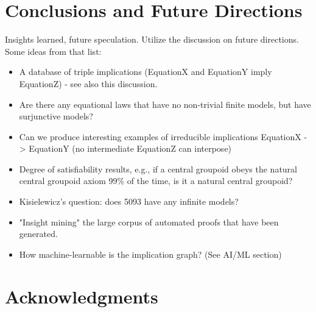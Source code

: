 \section{Conclusions and Future Directions}


Insights learned, future speculation. Utilize the discussion on future directions. Some ideas from that list:

\begin{itemize}
  \item A database of triple implications (EquationX and EquationY imply EquationZ) - see also this discussion.
  \item Are there any equational laws that have no non-trivial finite models, but have surjunctive models?
  \item Can we produce interesting examples of irreducible implications EquationX -> EquationY (no intermediate EquationZ can interpose)
  \item Degree of satisfiability results, e.g., if a central groupoid obeys the natural central groupoid axiom 99\% of the time, is it a natural central groupoid?
  \item Kisielewicz's question: does 5093 have any infinite models?
  \item "Insight mining" the large corpus of automated proofs that have been generated.
  \item How machine-learnable is the implication graph? (See AI/ML section)
\end{itemize}

\section*{Acknowledgments}

